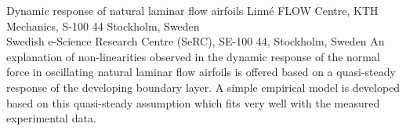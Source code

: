 %
\papertitle%
{%
 Dynamic response of natural laminar flow airfoils%
}%
%
%
%
%
%
\paperaffiliation
{%
  Linn\'e FLOW Centre, KTH Mechanics, S-100 44 Stockholm, Sweden\\
  Swedish e-Science Research Centre (SeRC), SE-100 44, Stockholm, Sweden%
}%
%
%
%
%
%
%
%
%
%
%
\papersummary%
{%
	An explanation of non-linearities observed in the dynamic response of the normal force in oscillating natural laminar flow airfoils is offered based on a quasi-steady response of the developing boundary layer. A simple empirical model is developed based on this quasi-steady assumption which fits very well with the measured experimental data.
}%
%
\graphicspath{{unsteady_model/imgs/}{unsteady_model/imgs2/}}%
%
%
%
